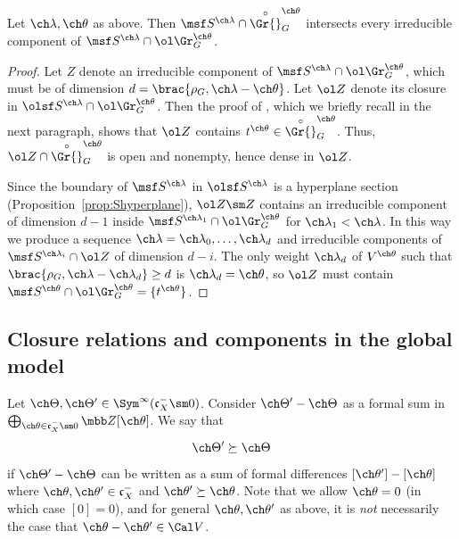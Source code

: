 \begin{lem}
\notready \label{lem:MVcentralfiber}
Let $\ch\lambda,\ch\theta$ as above. Then
$\msf S^{\ch\lambda} \cap \overset\circ\Gr{}^{\ch\theta}_G$
intersects every irreducible component
of $\msf S^{\ch\lambda} \cap \ol\Gr^{\ch\theta}_G$.
\end{lem}
\begin{proof}
Let $Z$ denote an irreducible component of $\msf S^{\ch\lambda}\cap \ol\Gr^{\ch\theta}_G$, which must be
of dimension $d=\brac{\rho_G, \ch\lambda-\ch\theta}$.
Let $\ol Z$ denote its closure in $\olsf S^{\ch\lambda} \cap \ol\Gr^{\ch\theta}_G$.
Then the proof of \cite[Theorem 3.2]{MV}, which we briefly recall in the next paragraph,
shows that $\ol Z$ contains $t^{\ch\theta} \in \overset\circ\Gr{}^{\ch\theta}_G$.
Thus, $\ol Z \cap \overset\circ\Gr{}^{\ch\theta}_G$ is open and nonempty, hence dense
in $\ol Z$.

Since the boundary of $\msf S^{\ch\lambda}$ in $\olsf S^{\ch\lambda}$
is a hyperplane section (Proposition~\ref{prop:Shyperplane}),
$\ol Z\sm Z$ contains an irreducible component of dimension $d-1$
inside $\msf S^{\ch\lambda_1}\cap \ol\Gr^{\ch\theta}_G$ for $\ch\lambda_1 < \ch\lambda$.
In this way we produce a sequence $\ch\lambda=\ch\lambda_0, \dotsc, \ch\lambda_d$
and irreducible components of $\msf S^{\ch\lambda_i} \cap \ol Z$
of dimension $d-i$.
The only weight $\ch\lambda_d$ of $V^{\ch\theta}$ such that
$\brac{\rho_G,\ch\lambda-\ch\lambda_d} \ge d$
is $\ch\lambda_d=\ch\theta$, so $\ol Z$ must contain $\msf S^{\ch\theta}\cap \ol\Gr^{\ch\theta}_G
= \{ t^{\ch\theta} \}$.
\end{proof}



\subsection{Closure relations and components in the global model}
\label{sect:closures}

Let $\ch\Theta, \ch\Theta' \in \Sym^\infty(\mathfrak c_X^- \sm 0)$. Consider $\ch\Theta'-\ch\Theta$ as a formal sum
in $\bigoplus_{\ch\theta\in \mathfrak c_X^-\sm 0} \mbb Z [\ch\theta]$. We say that
\[ \ch\Theta' \succeq \ch\Theta \]
if $\ch\Theta'-\ch\Theta$ can be written as a sum of formal differences
$[\ch\theta']-[\ch\theta]$ where $\ch\theta,\ch\theta'\in \mathfrak c_X^-$ and $\ch\theta' \succeq \ch\theta$.
Note that we allow $\ch\theta=0$ (in which case $[0]=0$),
and for general $\ch\theta,\ch\theta'$ as
above, it is \emph{not} necessarily the case that $\ch\theta-\ch\theta' \in \Cal V$.

